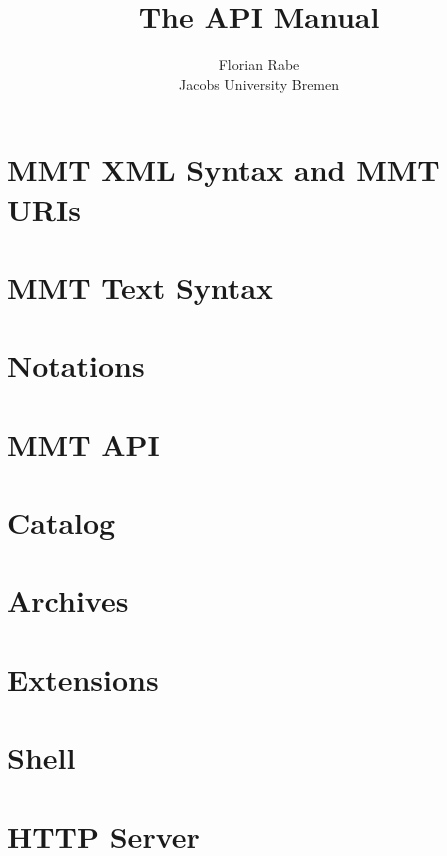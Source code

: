 \documentclass{article}
\title{The {\mmt} API Manual}
\author{Florian Rabe \\
Jacobs University Bremen}
\begin{document}
\maketitle


\section{MMT XML Syntax and MMT URIs}\label{sec:syntax}
  

\section{MMT Text Syntax}\label{sec:syntax}
  

\section{Notations}\label{sec:notations}
  

\section{MMT API}

\section{Catalog}\label{sec:catalog}
  

\section{Archives}\label{sec:archives}
  

\section{Extensions}\label{sec:extensions}
  

\section{Shell}\label{sec:shell}
  

\section{HTTP Server}\label{sec:http}
  




\end{document}
